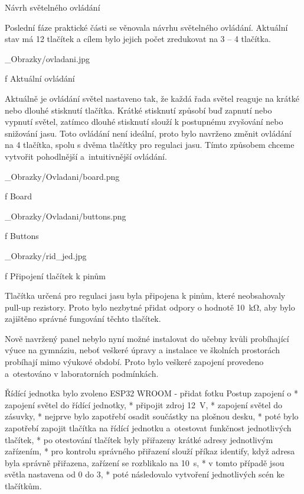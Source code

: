 \chap Návrh světelného ovládání


Poslední fáze praktické části se věnovala návrhu světelného ovládání. Aktuální stav má 12 tlačítek a
cílem bylo jejich počet zredukovat na 3 -- 4 tlačítka.

\medskip {}
\picw=10cm _Obrazky/ovladani.jpg
\caption/f Aktuální ovládání
\medskip


Aktuálně je ovládání světel nastaveno tak, že každá řada světel reaguje na krátké nebo dlouhé stisknutí tlačítka.
Krátké stisknutí způsobí buď zapnutí nebo vypnutí světel, zatímco dlouhé stisknutí slouží k postupnému zvyšování
nebo snižování jasu.
Toto ovládání není ideální, proto bylo navrženo změnit ovládání na 4 tlačítka, spolu s dvěma tlačítky pro regulaci jasu.
Tímto způsobem chceme vytvořit pohodlnější a~intuitivnější ovládání.

\medskip {}
\picw=10cm _Obrazky/Ovladani/board.png
\caption/f Board
\medskip

\medskip {}
\picw=10cm _Obrazky/Ovladani/buttons.png
\caption/f Buttons
\medskip

\medskip {}
\picw=10cm _Obrazky/rid_jed.jpg
\caption/f Připojení tlačítek k pinům
\medskip


Tlačítka určená pro regulaci jasu byla připojena k pinům, které neobsahovaly pull-up rezistory.
Proto bylo nezbytné přidat odpory o hodnotě 10~kΩ, aby bylo zajištěno správné fungování těchto tlačítek.

Nově navržený panel nebylo nyní možné instalovat do učebny kvůli probíhající výuce na gymnáziu, neboť veškeré úpravy
a instalace ve školních prostorách probíhají mimo výukové období. Proto bylo veškeré zapojení provedeno a~otestováno v laboratorních podmínkách.

\medskip
\noindent
Řídící jednotka bylo zvoleno ESP32 WROOM - přidat fotku
\noindent
{\sbf Postup zapojení}
\begitems \style o
* zapojení světel do řídící jednotky,
* připojit zdroj 12~V,
* zapojení světel do zásuvky,
* nejprve bylo zapotřebí osadit součástky na plošnou desku,
* poté bylo zapotřebí zapojit tlačítka na řídící jednotku a~otestovat funkčnost jednotlivých tlačítek,
* po otestování tlačítek byly přiřazeny krátké adresy jednotlivým zařízením,
* pro kontrolu správného přiřazení slouží příkaz identify, když adresa byla správně přiřazena, zařízení se rozblikalo na 10~s,
* v tomto případě jsou světla nastavena od 0 do 3,
* poté následovalo vytvoření jednotlivých scén ke tlačítkům.
\enditems

